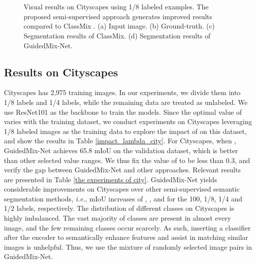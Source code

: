 \begin{figure*}[t]
\\\vspace{0.3mm}
\setcounter{subfigure}{0}
\hspace{0.1mm}
\hspace{0.1mm}
\hspace{0.1mm}
\\
\caption{Visual results on Cityscapes using 1/8 labeled examples. 
The proposed semi-supervised approach generates improved results compared to ClassMix \cite{olsson2021classmix}.
(a) Input image. 
(b) Ground-truth.
(c) Segmentation results of ClassMix.
(d) Segmentation results of GuidedMix-Net.}
\label{qr_city}
\end{figure*}


\subsection{Results on Cityscapes}
Cityscapes has 2,975 training images.
In our experiments, we divide them into 1/8 labels and 1/4 labels, while the remaining data are treated as unlabeled.
We use ResNet101 as the backbone to train the models.
Since the optimal value of  varies with the training dataset, we conduct experiments on Cityscapes leveraging 1/8 labeled images as the training data to explore the impact of  on this dataset, and show the results in Table \ref{impact_lambda_city}.
For Cityscapes, when , GuidedMix-Net achieves 65.8 mIoU on the validation dataset, which is better than other selected value ranges.
We thus fix the value of  to be less than 0.3, and verify the gap between GuidedMix-Net and other approaches.
Relevant results are presented in Table \ref{the experiments of city}.
GuidedMix-Net yields considerable improvements on Cityscapes over other semi-supervised semantic segmentation methods, \textit{i.e.}, mIoU increases of , ,  and  for the 100, 1/8, 1/4 and 1/2 labels, respectively.
The distribution of different classes on Cityscapes is highly imbalanced.
The vast majority of classes are present in almost every image, and the few remaining classes occur scarcely.
As such, inserting a classifier after the encoder to semantically enhance features and assist in matching similar images is unhelpful.
Thus, we use the mixture of randomly selected image pairs in GuidedMix-Net.

